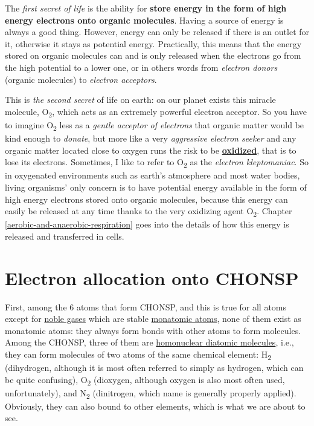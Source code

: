 \documentclass[]{book}
\theoremstyle{definition}
\theoremstyle{definition}
\theoremstyle{definition}
\theoremstyle{remark}
\begin{document}
The \emph{first secret of life} is the ability for \textbf{store energy
in the form of high energy electrons onto organic molecules}. Having a
source of energy is always a good thing. However, energy can only be
released if there is an outlet for it, otherwise it stays as potential
energy. Practically, this means that the energy stored on organic
molecules can and is only released when the electrons go from the high
potential to a lower one, or in others words from \emph{electron donors}
(organic molecules) to \emph{electron acceptors}.

This is \emph{the second secret} of life on earth: on our planet exists
this miracle molecule, O\textsubscript{2}, which acts as an extremely
powerful electron acceptor. So you have to imagine O\textsubscript{2}
less as a \emph{gentle acceptor of electrons} that organic matter would
be kind enough to \emph{donate}, but more like a very \emph{aggressive
electron seeker} and any organic matter located close to oxygen runs the
risk to be \textbf{\protect\hyperlink{oxidation}{oxidized}}, that is to
lose its electrons. Sometimes, I like to refer to O\textsubscript{2} as
the \emph{electron kleptomaniac}. So in oxygenated environments such as
earth's atmosphere and most water bodies, living organisms' only concern
is to have potential energy available in the form of high energy
electrons stored onto organic molecules, because this energy can easily
be released at any time thanks to the very oxidizing agent
O\textsubscript{2}. Chapter \ref{aerobic-and-anaerobic-respiration} goes
into the details of how this energy is released and transferred in
cells.

\section{Electron allocation onto
CHONSP}\label{electron-allocation-onto-chonsp}

First, among the 6 atoms that form CHONSP, and this is true for all
atoms except for \href{https://en.wikipedia.org/wiki/Noble_gas}{noble
gases} which are stable
\href{https://en.wikipedia.org/wiki/Monatomic_gas}{monatomic atoms},
none of them exist as monatomic atoms: they always form bonds with other
atoms to form molecules. Among the CHONSP, three of them are
\href{https://en.wikipedia.org/wiki/Diatomic_molecule}{homonuclear
diatomic molecules}, i.e., they can form molecules of two atoms of the
same chemical element: H\textsubscript{2} (dihydrogen, although it is
most often referred to simply as hydrogen, which can be quite
confusing), O\textsubscript{2} (dioxygen, although oxygen is also most
often used, unfortunately), and N\textsubscript{2} (dinitrogen, which
name is generally properly applied). Obviously, they can also bound to
other elements, which is what we are about to see.
\end{document}
